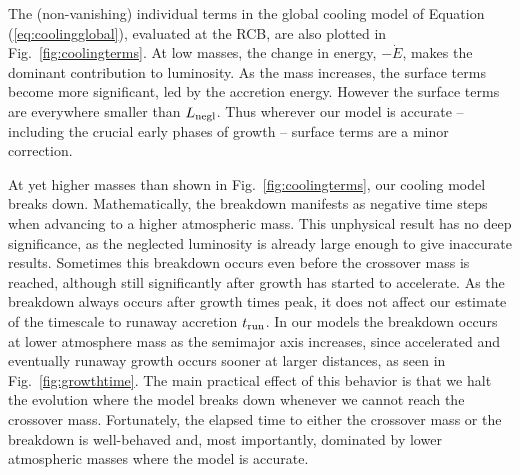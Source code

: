 \documentclass[apj, numberedappendix]{emulateapj}
\newcommand{\Eq}[1]{Equation\,(\ref{#1})}
\newcommand{\Fig}[1]{Fig.~\ref{#1}}
\begin{document}
The (non-vanishing) individual terms in the global cooling model of \Eq{eq:coolingglobal}, evaluated at the RCB, are also plotted in \Fig{fig:coolingterms}.  At low masses, the change in energy, $- \dot{E}$, makes the dominant contribution to luminosity.  As the mass increases, the surface terms become more significant, led by the accretion energy.  However the surface terms are everywhere smaller than $L_{\rm negl}$.  Thus wherever our model is accurate -- including the crucial early phases of growth -- surface terms are a minor correction.  

At yet higher masses than shown in \Fig{fig:coolingterms}, our cooling model breaks down.  Mathematically, the breakdown manifests as negative time steps when advancing to a higher atmospheric mass.  This unphysical result has no deep significance, as the neglected luminosity is already large enough to give inaccurate results.  Sometimes this breakdown occurs even before the crossover mass is reached, although still significantly after growth has started to accelerate. As the breakdown always occurs after growth times peak, it does not affect our estimate of the timescale to runaway accretion $t_{\rm run}$. In our models the breakdown occurs at lower atmosphere mass as the semimajor axis increases, since accelerated and eventually runaway growth occurs sooner at larger distances, as seen in \Fig{fig:growthtime}. The main practical effect of this behavior is that we halt the evolution where the model breaks down whenever we cannot reach the crossover mass.   Fortunately, the elapsed time to either the crossover mass or the breakdown is well-behaved and, most importantly, dominated by lower atmospheric masses where the model is accurate.  
\end{document}
